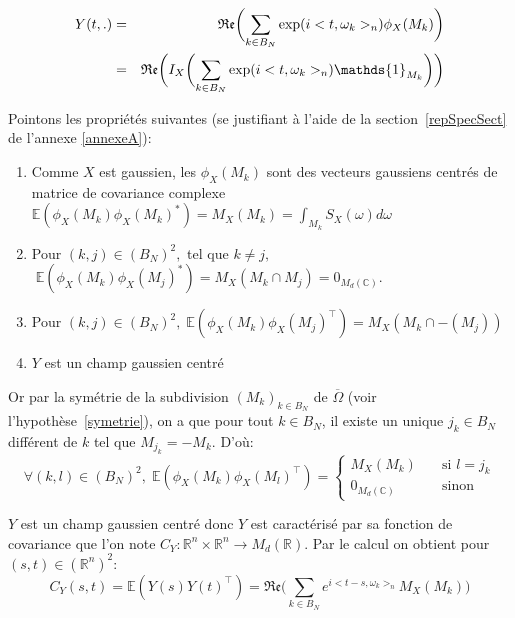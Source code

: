 \begin{eqnarray}
Y(t,.) &=& \mathfrak{Re}\biggl(\displaystyle\sum_{k \in B_N} \exp(i<t,\omega_k>_{n}) \phi_X(M_k)\biggr) \notag{} \\
  &=& \mathfrak{Re}\biggl(I_X\biggl(\displaystyle\sum_{k \in B_N} \exp(i<t,\omega_k>_{n})\mathds{1}_{M_k}\biggl)\biggr) \notag{}
\end{eqnarray}

\noindent Pointons les propriétés suivantes (se justifiant à l'aide de la section~\ref{repSpecSect} de l'annexe \ref{annexeA}):
\begin{enumerate}
\item Comme $X$ est gaussien, les $\phi_X(M_k)$ sont des vecteurs gaussiens centrés de matrice de covariance complexe $\mathbb{E}(\phi_X(M_k)\phi_X(M_k)^{*}) = M_X(M_k) = \int_{M_k} S_X(\omega)d\omega$ 

\item Pour $(k,j) \in (B_N)^2,$ tel que $k \neq j,$ \\$  \; \mathbb{E}(\phi_X(M_k)\phi_X(M_j)^{*}) =  M_X(M_k \cap M_j) = 0_{M_d(\mathbb{C})}$.

\item Pour $(k,j) \in (B_N)^2, \; \mathbb{E}(\phi_X(M_k)\phi_X(M_j)^{\top}) = M_X(M_k \cap -(M_j))$

\item $Y$ est un champ gaussien centré \\
\end{enumerate}

\noindent Or par la symétrie de la subdivision $(M_k)_{k \in B_N}$ de $\overline{\Omega}$ (voir l'hypothèse~\ref{symetrie}), on a que pour tout $k \in B_N$, il existe un unique $j_k \in B_N$ différent de $k$ tel que $M_{j_k} = -M_k$. D'où:
\begin{equation}
  \label{five}
  \forall (k,l) \in (B_N)^2, \; \mathbb{E}(\phi_X(M_k)\phi_X(M_l)^{\top}) =
\begin{cases}
    M_X(M_k)    & \quad \text{si } l = j_k\\
    0_{M_d(\mathbb{C})}  & \quad \text{sinon }  \end{cases}
\end{equation}


\noindent $Y$ est un champ gaussien centré donc $Y$ est caractérisé par sa fonction de covariance que l'on note $C_Y: \mathbb{R}^n \times \mathbb{R}^n \rightarrow M_d(\mathbb{R})$. Par le calcul on obtient pour $(s,t) \in (\mathbb{R}^n)^2 :$
\begin{equation}
C_Y(s,t) = \mathbb{E}(Y(s)Y(t)^{\top}) = \mathfrak{Re}\biggl(\displaystyle\sum_{k \in B_N} e^{i<t-s,\omega_k>_n}M_X(M_k)\biggr)
\end{equation}

